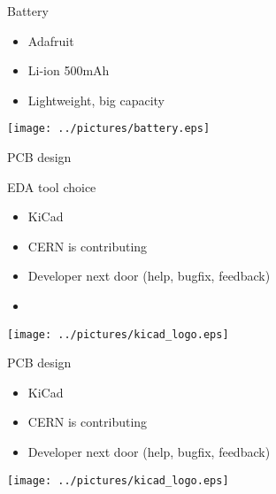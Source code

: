 \documentclass[compress,red]{beamer}
\begin{document}
\begin{frame}{Battery}

  \begin{block}{}
    \begin{itemize}
    \item Adafruit
    \item Li-ion 500mAh
    \item Lightweight, big capacity
    \end{itemize}
  \end{block}

  \begin{center}
    \texttt{[image: ../pictures/battery.eps]}
  \end{center}

  \note[item]{}

\end{frame}

\begin{frame}{PCB design}

  \begin{block}{EDA tool choice}
    \begin{itemize}
    \item KiCad
    \item CERN is contributing
    \item Developer next door (help, bugfix, feedback)
    \item 
    \end{itemize}
  \end{block}

  \begin{center}
    \texttt{[image: ../pictures/kicad\_logo.eps]}
  \end{center}

  \note[item]{}

\end{frame}

\begin{frame}{PCB design}

  \begin{block}{}
    \begin{itemize}
    \item KiCad
    \item CERN is contributing
    \item Developer next door (help, bugfix, feedback)
    \end{itemize}
  \end{block}

  \begin{center}
    \texttt{[image: ../pictures/kicad\_logo.eps]}
  \end{center}

  \note[item]{}

\end{frame}
\end{document}
